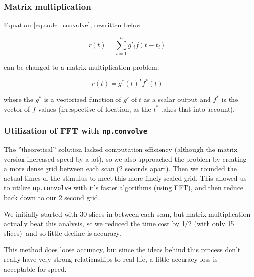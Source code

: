 \documentclass[11pt]{article}
\begin{document}
\subsubsection{Matrix multiplication}
Equation \ref{eq:code_convolve}, rewritten below

$$r(t)= \sum_{i=1}^n g'_{i} f(t-t_i)$$

can be changed to a matrix multiplication problem:

\begin{equation} \label{eq:matrix_code_convolve}
r(t)=  g^*(t)^T f^*(t)
\end{equation}

where the $g^*$ is a vectorized function of $g'$ of $t$ as a scalar output and 
$f^*$ is the vector of $f$ values (irrespective of location, as the $t^*$ 
takes that into account).


\subsubsection{Utilization of FFT with \texttt{np.convolve}}
The ''theoretical'' solution lacked computation efficiency (although the 
matrix version increased speed by a lot), so we also approached the problem by 
creating a more dense grid between each scan (2 seconds apart). Then we rounded 
the actual times of the stimulus to meet this more finely scaled grid. This 
allowed us to utilize \texttt{np.convolve} with it's faster algorithms 
(using FFT), and then reduce back down to our 2 second grid.

We initially started with 30 slices in between each scan, but matrix 
multiplication actually beat this analysis, so we reduced the time cost by 1/2 
(with only 15 slices), and so little decline is accuracy.

This method does loose accuracy, but since the ideas behind this process don't 
really have very strong relationships to real life, a little accuracy loss is 
acceptable for speed.





\end{document}
